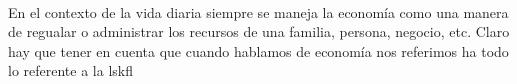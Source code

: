 
\justify
\fontsize{12pt}{14}\
\setlength{\parindent}{0cm}

\normalsize En el contexto de la vida diaria siempre se maneja la economía como una manera de regualar o administrar los recursos de una familia, persona, negocio, etc. Claro hay que tener en cuenta que cuando hablamos de economía nos referimos ha todo lo referente a la lskfl
